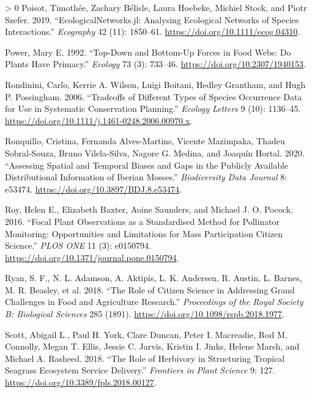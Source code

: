 \documentclass[10pt,oneside]{article}
\newlength{\cslhangindent}
\newenvironment{CSLReferences}[3] %
 {%
  \setlength{\parindent}{0pt}
  \ifodd #1 \everypar{\setlength{\hangindent}{\cslhangindent}}\ignorespaces\fi
  \ifnum #2 > 0
  \setlength{\parskip}{#2\baselineskip}
  \fi
 }%
 {}
\begin{document}
\begin{CSLReferences}{1}{0}
\leavevmode\hypertarget{ref-Poisot2019EcoJl}{}%
Poisot, Timothée, Zachary Bélisle, Laura Hoebeke, Michiel Stock, and
Piotr Szefer. 2019. {``EcologicalNetworks.jl: Analysing Ecological
Networks of Species Interactions.''} \emph{Ecography} 42 (11): 1850--61.
\url{https://doi.org/10.1111/ecog.04310}.

\leavevmode\hypertarget{ref-Power1992TopBot}{}%
Power, Mary E. 1992. {``Top-Down and Bottom-Up Forces in Food Webs: Do
Plants Have Primacy.''} \emph{Ecology} 73 (3): 733--46.
\url{https://doi.org/10.2307/1940153}.

\leavevmode\hypertarget{ref-Rondinini2006TraDif}{}%
Rondinini, Carlo, Kerrie A. Wilson, Luigi Boitani, Hedley Grantham, and
Hugh P. Possingham. 2006. {``Tradeoffs of Different Types of Species
Occurrence Data for Use in Systematic Conservation Planning.''}
\emph{Ecology Letters} 9 (10): 1136--45.
\url{https://doi.org/10.1111/j.1461-0248.2006.00970.x}.

\leavevmode\hypertarget{ref-Ronquillo2020AssSpa}{}%
Ronquillo, Cristina, Fernanda Alves-Martins, Vicente Mazimpaka, Thadeu
Sobral-Souza, Bruno Vilela-Silva, Nagore G. Medina, and Joaquín Hortal.
2020. {``Assessing Spatial and Temporal Biases and Gaps in the Publicly
Available Distributional Information of Iberian Mosses.''}
\emph{Biodiversity Data Journal} 8: e53474.
\url{https://doi.org/10.3897/BDJ.8.e53474}.

\leavevmode\hypertarget{ref-Roy2016FocPla}{}%
Roy, Helen E., Elizabeth Baxter, Aoine Saunders, and Michael J. O.
Pocock. 2016. {``Focal Plant Observations as a Standardised Method for
Pollinator Monitoring: Opportunities and Limitations for Mass
Participation Citizen Science.''} \emph{PLOS ONE} 11 (3): e0150794.
\url{https://doi.org/10.1371/journal.pone.0150794}.

\leavevmode\hypertarget{ref-Ryan2018RolCit}{}%
Ryan, S. F., N. L. Adamson, A. Aktipis, L. K. Andersen, R. Austin, L.
Barnes, M. R. Beasley, et al. 2018. {``The Role of Citizen Science in
Addressing Grand Challenges in Food and Agriculture Research.''}
\emph{Proceedings of the Royal Society B: Biological Sciences} 285
(1891). \url{https://doi.org/10.1098/rspb.2018.1977}.

\leavevmode\hypertarget{ref-Scott2018RolHer}{}%
Scott, Abigail L., Paul H. York, Clare Duncan, Peter I. Macreadie, Rod
M. Connolly, Megan T. Ellis, Jessie C. Jarvis, Kristin I. Jinks, Helene
Marsh, and Michael A. Rasheed. 2018. {``The Role of Herbivory in
Structuring Tropical Seagrass Ecosystem Service Delivery.''}
\emph{Frontiers in Plant Science} 9: 127.
\url{https://doi.org/10.3389/fpls.2018.00127}.


\end{CSLReferences}
\end{document}

